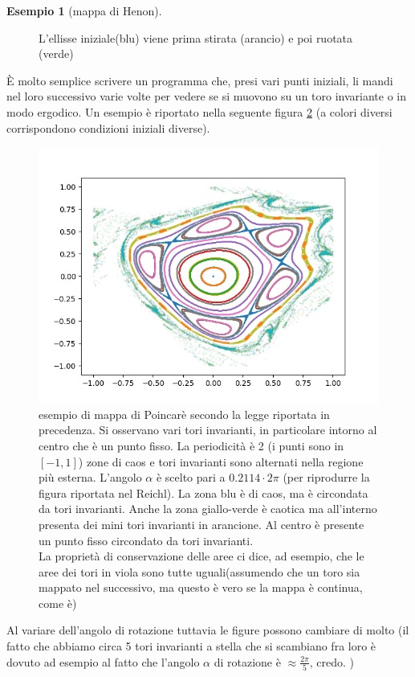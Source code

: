 \documentclass[a4paper,12pt]{article}
\theoremstyle{plain}
\theoremstyle{definition}
\newtheorem{exmp}{Esempio}[section]
\newcommand{\f}[2]{\frac{#1}{#2}}
\theoremstyle{remark}
\begin{document}
\begin{exmp}[mappa di Henon]
\begin{figure}[h]
		\caption{L'ellisse iniziale(blu) viene prima stirata (arancio) e poi ruotata (verde)}
		\label{ell}
	\end{figure}
È molto semplice scrivere un programma che, presi vari punti iniziali, li mandi nel loro successivo varie volte per vedere se si muovono su un toro invariante o in modo ergodico. Un esempio è riportato nella seguente figura \ref{epileptic} (a colori diversi corrispondono condizioni iniziali diverse).
\begin{figure}[h]
	\includegraphics[scale=1.1,width=\textwidth]{epileptic}
	\caption{esempio di mappa di Poincarè secondo la legge riportata in precedenza. Si osservano vari tori invarianti, in particolare intorno al centro che è un punto fisso. La periodicità è 2 (i punti sono in $[-1,1]$) zone di caos e tori invarianti sono alternati nella regione più esterna. L'angolo $\alpha$ è scelto pari a $0.2114 \cdot2\pi$ (per riprodurre la figura riportata nel Reichl). La zona blu è di caos, ma è circondata da tori invarianti. Anche la zona giallo-verde è caotica ma all'interno presenta dei mini tori invarianti in arancione. Al centro è presente un punto fisso circondato da tori invarianti.\\ La proprietà di conservazione delle aree ci dice, ad esempio, che le aree dei tori in viola sono tutte uguali(assumendo che un toro sia mappato nel successivo, ma questo è vero se la mappa è continua, come è)}
	\label{epileptic}
\end{figure}
Al variare dell'angolo di rotazione tuttavia le figure possono cambiare di molto (il fatto che abbiamo circa 5 tori invarianti a stella che si scambiano fra loro è dovuto ad esempio al fatto che l'angolo $\alpha$ di rotazione è $\approx\f{2\pi}{5}$, credo. )

\end{exmp}
\end{document}
